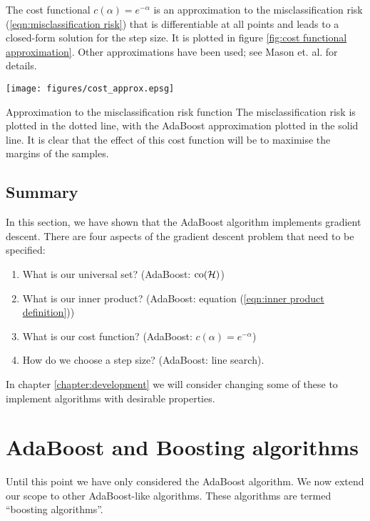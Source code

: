 The cost functional $c(\alpha) = e^{-\alpha}$ is an approximation to
the misclassification risk (\ref{eqn:misclassification risk}) that is
differentiable at all points and leads to a closed-form solution for
the step size.  It is plotted in figure \ref{fig:cost functional
approximation}.  Other approximations have been used; see Mason
et. al. \cite{Mason99} for details.

\begin{linefigure}
\begin{center}
\texttt{[image: figures/cost\_approx.epsg]}
\end{center}
\begin{capt}{Approximation to the misclassification risk function}
The misclassification risk is plotted in the dotted line, with the
AdaBoost approximation plotted in the solid line.  It is clear that
the effect of this cost function will be to maximise the margins of
the samples.
\end{capt}
\label{fig:cost functional}
\end{linefigure}

\subsection{Summary}

In this section, we have shown that the AdaBoost algorithm implements
gradient descent.  There are four aspects of the gradient descent
problem that need to be specified:
%
\begin{enumerate}
\item	What is our universal set? (AdaBoost: $\mathrm{co}(\mathcal{H})$)
\item	What is our inner product? (AdaBoost: equation (\ref{eqn:inner
	product definition}))
\item	What is our cost function? (AdaBoost: $c(\alpha) =
	e^{-\alpha}$)
\item	How do we choose a step size? (AdaBoost: line search).
\end{enumerate}
%
In chapter \ref{chapter:development} we will consider changing some of
these to implement algorithms with desirable properties.

\section{AdaBoost and Boosting algorithms}

Until this point we have only considered the AdaBoost algorithm.  We
now extend our scope to other AdaBoost-like algorithms.  These
algorithms are termed ``boosting algorithms''.

